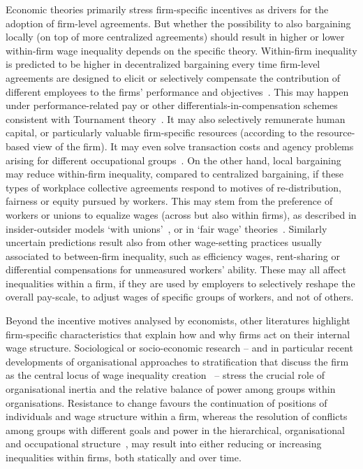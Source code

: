 \documentclass[Review,times,sageh,11pt]{sagej}
\begin{document}
Economic theories primarily stress firm-specific incentives as drivers for the adoption of firm-level agreements. But whether the possibility to also bargaining locally (on top of more centralized agreements) should result in higher or lower within-firm wage inequality depends on the specific theory.
Within-firm inequality is predicted to be higher in decentralized bargaining every time firm-level agreements are designed to elicit or selectively compensate the contribution of different employees to the firms' performance and objectives~\citep{bayo2013diffusion}.
This may happen under performance-related pay or other differentials-in-compensation schemes consistent with Tournament theory~\citep{lazear.1979}. It may also selectively remunerate human capital, or particularly valuable firm-specific resources (according to the resource-based view of the firm). It may even solve transaction costs and agency problems arising for different occupational groups~\citep{eisenhardt1989agency,o1998structure}. On the other hand, local bargaining may reduce within-firm inequality, compared to centralized bargaining, if these types of workplace collective agreements respond to motives of re-distribution, fairness or equity pursued by workers. This may stem from the preference of workers or unions to equalize wages (across but also within firms), as described in insider-outsider models ‘with unions’~\citep{lindbeck1986wage,lindbeck2001insiders}, or in ‘fair wage’ theories~\citep{akerlof.1984}. 
Similarly uncertain predictions result also from other wage-setting practices usually associated to between-firm inequality, such as efficiency wages, rent-sharing or differential compensations for unmeasured workers' ability. These may all affect inequalities within a firm, if they are used by employers to selectively reshape the overall pay-scale, to adjust wages of specific groups of workers, and not of others.

Beyond the incentive motives analysed by economists, other literatures highlight  firm-specific characteristics that explain how and why firms act on their internal wage structure. Sociological or socio-economic research -- and in particular recent developments of organisational approaches to stratification that discuss the firm as the central locus of wage inequality creation~\citep{stainback2010,cobb2016} -- stress the crucial role of organisational inertia and the relative balance of power among groups within organisations. Resistance to change favours the continuation of positions of individuals and wage structure within a firm, whereas the resolution of conflicts among groups with different goals and power in the hierarchical, organisational and occupational structure~\citep{blau1967american, goldthorpe1972occupational, wright1980class, erikson2002intergenerational}, may result into either reducing or increasing inequalities within firms, both statically and over time. 
\end{document}
